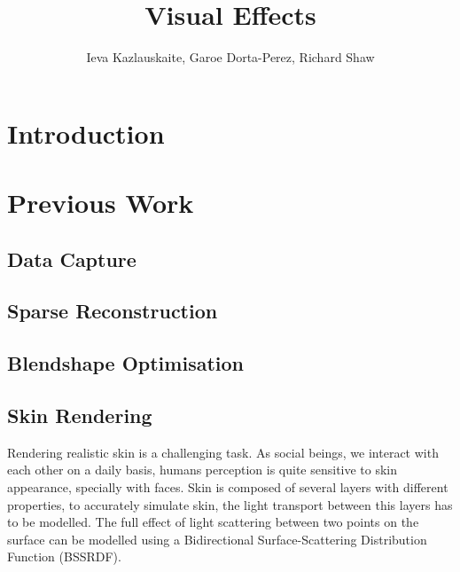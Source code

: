 \documentclass[11pt]{report}
\title{Visual Effects} \author{Ieva Kazlauskaite, Garoe Dorta-Perez, Richard Shaw}
\begin{document}
\maketitle

\chapter{Introduction}
\label{ch:intro}
\begin{center}
\end{center}


\chapter{Previous Work}
\label{sec:previous}

\section{Data Capture}


\section{Sparse Reconstruction}


\section{Blendshape Optimisation}


\section{Skin Rendering}

Rendering realistic skin is a challenging task.
As social beings, we interact with each other on a daily basis, humans perception is quite sensitive to skin appearance, specially with faces.
Skin is composed of several layers with different properties, to accurately simulate skin, the light transport between this layers has to be modelled.
The full effect of light scattering between two points on the surface can be modelled using a Bidirectional Surface-Scattering Distribution Function (BSSRDF).
\end{document}
